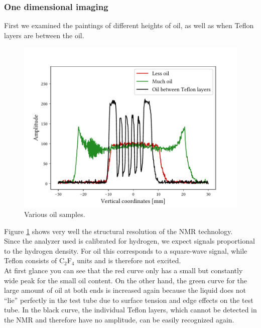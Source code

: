 \subsubsection{One dimensional imaging}
First we examined the paintings of different heights of oil, as well as when Teflon layers are between the oil.
\begin{figure}[ht]
\centering
\includegraphics[scale=.6]{..//figures//f61_abb_8.pdf}
\caption{Various oil samples.}
\label{fig:oil}
\end{figure}
Figure \ref{fig:oil} shows very well the structural resolution of the NMR technology.\\
Since the analyzer used is calibrated for hydrogen, we expect signals proportional to the hydrogen density.
For oil this corresponds to a square-wave signal, while Teflon consists of C$_2$F$_4$ units and is therefore not excited.\\
At first glance you can see that the red curve only has a small but constantly wide peak for the small oil content.
On the other hand, the green curve for the large amount of oil at both ends is increased again because the liquid does not \enquote{lie} perfectly in the test tube due to surface tension and edge effects on the test tube.
In the black curve, the individual Teflon layers, which cannot be detected in the NMR and therefore have no amplitude, can be easily recognized again.\\

